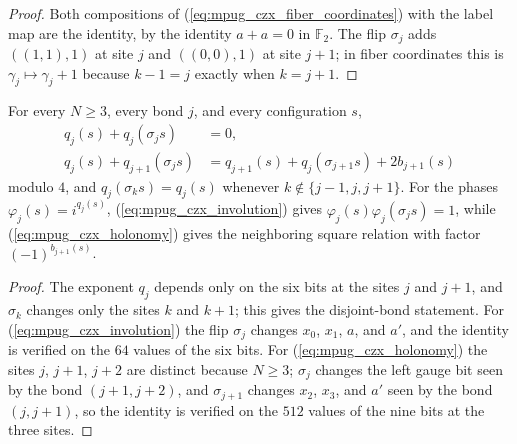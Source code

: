 \begin{proof}\leanok
    Both compositions of (\ref{eq:mpug_czx_fiber_coordinates}) with the
    label map are the identity, by the identity $a+a=0$ in $\mathbb F_2$.
    The flip $\sigma_j$ adds $((1,1),1)$ at site $j$ and $((0,0),1)$ at
    site $j+1$; in fiber coordinates this is $\gamma_j\mapsto\gamma_j+1$
    because $k-1=j$ exactly when $k=j+1$.
\end{proof}

\begin{lemma}
    \label{thm:mpug_czx_holonomy}
    \leanok
    For every $N\geq3$, every bond $j$, and every configuration $s$,
    \begin{align}
        q_j(s)+q_j(\sigma_js)
         & =0,
        \label{eq:mpug_czx_involution}                \\
        q_j(s)+q_{j+1}(\sigma_js)
         & =q_{j+1}(s)+q_j(\sigma_{j+1}s)+2b_{j+1}(s)
        \label{eq:mpug_czx_holonomy}
    \end{align}
    modulo $4$, and $q_j(\sigma_ks)=q_j(s)$ whenever
    $k\notin\{j-1,j,j+1\}$. For the phases
    $\varphi_j(s)=i^{q_j(s)}$, (\ref{eq:mpug_czx_involution}) gives
    $\varphi_j(s)\varphi_j(\sigma_js)=1$, while
    (\ref{eq:mpug_czx_holonomy}) gives the neighboring square relation with
    factor $(-1)^{b_{j+1}(s)}$.
\end{lemma}

\begin{proof}\leanok
    The exponent $q_j$ depends only on the six bits at the sites $j$ and
    $j+1$, and $\sigma_k$ changes only the sites $k$ and $k+1$; this gives
    the disjoint-bond statement. For (\ref{eq:mpug_czx_involution}) the
    flip $\sigma_j$ changes $x_0$, $x_1$, $a$, and $a'$, and the identity is
    verified on the $64$ values of the six bits. For
    (\ref{eq:mpug_czx_holonomy}) the sites $j$, $j+1$, $j+2$ are distinct
    because $N\geq3$; $\sigma_j$ changes the left gauge bit seen by the bond
    $(j+1,j+2)$, and $\sigma_{j+1}$ changes $x_2$, $x_3$, and $a'$ seen by
    the bond $(j,j+1)$, so the identity is verified on the $512$ values of
    the nine bits at the three sites.
\end{proof}

